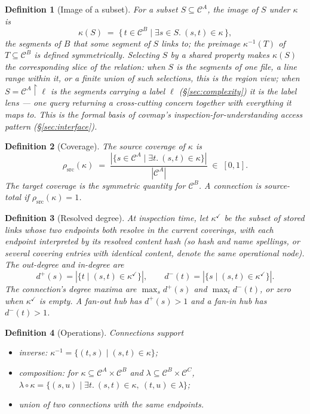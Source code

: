 \documentclass[11pt,a4paper]{article}
\newtheorem{definition}{Definition}[section]
\newcommand{\Cov}{\mathcal{C}}
\begin{document}
\begin{definition}[Image of a subset]\label{def:image}
For a subset $S \subseteq \Cov^A$, the \emph{image} of $S$ under $\kappa$
is
\[
  \kappa(S) \;=\; \{\, t \in \Cov^B \mid \exists s \in S.\ (s, t) \in \kappa \,\},
\]
the segments of $B$ that some segment of $S$ links to; the \emph{preimage}
$\kappa^{-1}(T)$ of $T \subseteq \Cov^B$ is defined symmetrically. Selecting
$S$ by a shared property makes $\kappa(S)$ the corresponding slice of the
relation: when $S$ is the segments of one file, a line range within it, or a
finite union of such selections, this is the \emph{region} view; when
$S = \Cov^A \restriction \ell$ is the segments carrying a label $\ell$
(\S\ref{sec:complexity}) it is the \emph{label lens} --- one query returning
a cross-cutting concern together with everything it maps to. This is the
formal basis of covmap's inspection-for-understanding access pattern
(\S\ref{sec:interface}).
\end{definition}

\begin{definition}[Coverage]\label{def:coverage}
The \emph{source coverage} of $\kappa$ is
\[
  \rho_{\mathrm{src}}(\kappa)
  \;=\;
  \frac{|\{s \in \Cov^A \mid \exists t.\ (s, t) \in \kappa\}|}{|\Cov^A|}
  \;\in\; [0, 1].
\]
The \emph{target coverage} is the symmetric quantity for $\Cov^B$. A
connection is \emph{source-total} if $\rho_{\mathrm{src}}(\kappa) = 1$.
\end{definition}

\begin{definition}[Resolved degree]\label{def:degree}
At inspection time, let $\kappa^\checkmark$ be the subset of stored links whose
two endpoints both resolve in the current coverings, with each endpoint
interpreted by its resolved content hash (so hash and name spellings, or
several covering entries with identical content, denote the same operational
node). The \emph{out-degree} and \emph{in-degree} are
\[
  d^+(s) = |\{t \mid (s,t) \in \kappa^\checkmark\}|,
  \qquad
  d^-(t) = |\{s \mid (s,t) \in \kappa^\checkmark\}|.
\]
The connection's degree maxima are $\max_s d^+(s)$ and $\max_t d^-(t)$,
or zero when $\kappa^\checkmark$ is empty. A \emph{fan-out hub} has
$d^+(s)>1$ and a \emph{fan-in hub} has $d^-(t)>1$.
\end{definition}

\begin{definition}[Operations]\label{def:conn-ops}
Connections support
\begin{itemize}[leftmargin=2em]
\item \emph{inverse:} $\kappa^{-1} = \{(t, s) \mid (s, t) \in \kappa\}$;
\item \emph{composition:} for
      $\kappa \subseteq \Cov^A \times \Cov^B$ and
      $\lambda \subseteq \Cov^B \times \Cov^C$,
      $\lambda \circ \kappa
       = \{(s, u) \mid \exists t.\ (s, t) \in \kappa,\ (t, u) \in \lambda\}$;
\item \emph{union} of two connections with the same endpoints.
\end{itemize}
\end{definition}
\end{document}
